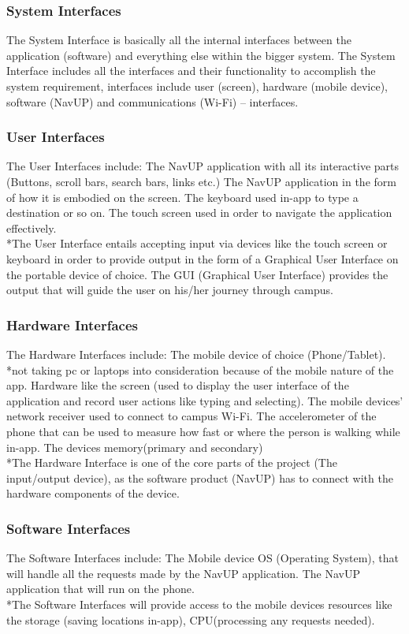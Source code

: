 \documentclass[12pt]{article}
\begin{document}
\subsubsection{System Interfaces}
The System Interface is basically all the internal interfaces between the application (software) and everything else within the bigger system.
The System Interface includes all the interfaces and their functionality to accomplish the system requirement, interfaces include user (screen), hardware (mobile device), software (NavUP) and communications (Wi-Fi) – interfaces.

\subsubsection{User Interfaces}
The User Interfaces include:
The NavUP application with all its interactive parts (Buttons, scroll bars, search bars, links etc.)
The NavUP application in the form of how it is embodied on the screen.
The keyboard used in-app to type a destination or so on.
The touch screen used in order to navigate the application effectively.\\
*The User Interface entails accepting input via devices like the touch screen or keyboard in order to provide output in the form of a Graphical User Interface on the portable device of choice. The GUI (Graphical User Interface) provides the output that will guide the user on his/her journey through campus. 

\subsubsection{Hardware Interfaces}
The Hardware Interfaces include:
The mobile device of choice (Phone/Tablet).
*not taking pc or laptops into consideration because of the mobile nature of the app.
Hardware like the screen (used to display the user interface of the application and record user actions like typing and selecting).
The mobile devices’ network receiver used to connect to campus Wi-Fi.
The accelerometer of the phone that can be used to measure how fast or where the person is walking while in-app.
The devices memory(primary and secondary)\\
*The Hardware Interface is one of the core parts of the project (The input/output device), as the software product (NavUP) has to connect with the hardware components of the device. 

\subsubsection{Software Interfaces}
The Software Interfaces include:
The Mobile device OS (Operating System), that will handle all the requests made by the NavUP application.
The NavUP application that will run on the phone.\\
*The Software Interfaces will provide access to the mobile devices resources like the storage (saving locations in-app), CPU(processing any requests needed).
\end{document}
